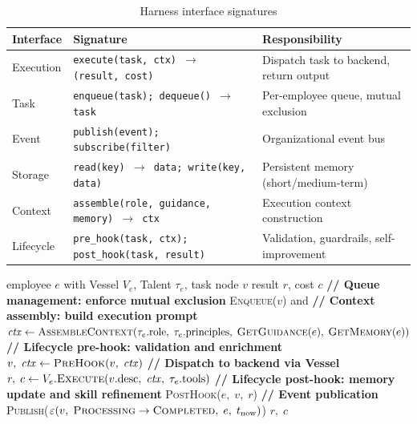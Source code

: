 \documentclass[11pt,a4paper]{article}
\begin{document}
\begin{table}[H]
\centering
\caption{Harness interface signatures}
\label{tab:harness-interfaces}
\small
\setlength{\tabcolsep}{4pt}
\begin{tabularx}{\textwidth}{@{}>{\ttfamily\raggedright\arraybackslash}p{}>{\raggedright\arraybackslash}p{}X@{}}
\toprule
\textbf{Interface} & \textbf{Signature} & \textbf{Responsibility} \\
\midrule
Execution & \texttt{execute(task, ctx) $\to$ (result, cost)} & Dispatch task to backend, return output \\
\addlinespace
Task & \texttt{enqueue(task); dequeue() $\to$ task} & Per-employee queue, mutual exclusion \\
\addlinespace
Event & \texttt{publish(event); subscribe(filter)} & Organizational event bus \\
\addlinespace
Storage & \texttt{read(key) $\to$ data; write(key, data)} & Persistent memory (short/medium-term) \\
\addlinespace
Context & \texttt{assemble(role, guidance, memory) $\to$ ctx} & Execution context construction \\
\addlinespace
Lifecycle & \texttt{pre\_hook(task, ctx); post\_hook(task, result)} & Validation, guardrails, self-improvement \\
\bottomrule
\end{tabularx}
\end{table}

\begin{algorithm}[H]
\caption{Harness-Mediated Task Execution.
\textnormal{Conventions: \textit{italic} = variables, \textsc{SmallCaps} = functions, $x.\mathrm{field}$ = field access.}}
\label{alg:harness}
\begin{algorithmic}[1]
\Require employee $e$ with Vessel $V_e$, Talent $\tau_e$, task node $v$
\Ensure result $r$, cost $c$
\State \textbf{// Queue management: enforce mutual exclusion}
    \State \textsc{Enqueue}($v$) and \Return
\EndIf
\State \textbf{// Context assembly: build execution prompt}
\State $\mathit{ctx} \gets \textsc{AssembleContext}(\tau_e.\mathrm{role},\; \tau_e.\mathrm{principles},\; \textsc{GetGuidance}(e),\; \textsc{GetMemory}(e))$
\State \textbf{// Lifecycle pre-hook: validation and enrichment}
\State $v,\; \mathit{ctx} \gets \textsc{PreHook}(v,\; \mathit{ctx})$ 
\State \textbf{// Dispatch to backend via Vessel}
\State $r,\; c \gets V_e.\textsc{Execute}(v.\mathrm{desc},\; \mathit{ctx},\; \tau_e.\mathrm{tools})$
\State \textbf{// Lifecycle post-hook: memory update and skill refinement}
\State \textsc{PostHook}($e,\; v,\; r$) 
\State \textbf{// Event publication}
\State \textsc{Publish}($\varepsilon(v,\; \textsc{Processing} \to \textsc{Completed},\; e,\; t_{\mathrm{now}})$)
\State \Return $r,\; c$
\end{algorithmic}
\end{algorithm}
\end{document}
